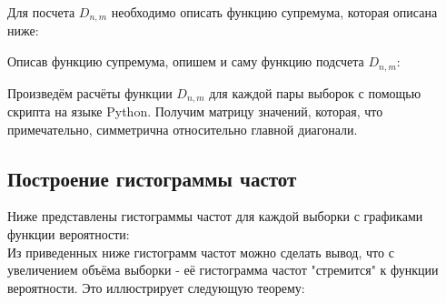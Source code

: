 \documentclass[14pt,a4paper,oneside]{extbook}
\begin{document}
    \begin{center}
    \end{center}

    Для посчета $D_{n, m}$ необходимо описать функцию супремума, которая описана ниже:
    
    
    Описав функцию супремума, опишем и саму функцию подсчета $D_{n, m}$: 
    
    
    Произведём расчёты функции $D_{n,m}$ для каждой пары выборок с помощью скрипта на языке Python. Получим матрицу значений, которая, что примечательно, симметрична относительно главной диагонали.
    
    \begin{center}
    \end{center}

  \subsection{Построение гистограммы частот}
  Ниже представлены гистограммы частот для каждой выборки с графиками функции вероятности: \\
  Из приведенных ниже гистограмм частот можно сделать вывод, что с увеличением объёма выборки - её гистограмма частот "стремится" к функции вероятности. Это иллюстрирует следующую теорему:\\
      
\end{document}
